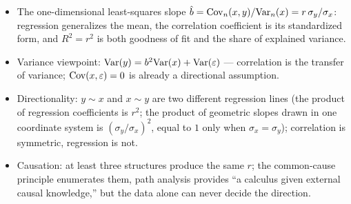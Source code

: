 \begin{keybox}
\begin{itemize}
  \item The one-dimensional least-squares slope $\hat{b} = \mathrm{Cov}_n(x,y)/\mathrm{Var}_n(x) = r\,\sigma_y/\sigma_x$: regression generalizes the mean, the correlation coefficient is its standardized form, and $R^2 = r^2$ is both goodness of fit and the share of explained variance.
  \item Variance viewpoint: $\mathrm{Var}(y) = b^2\mathrm{Var}(x) + \mathrm{Var}(\varepsilon)$ --- correlation is the transfer of variance; $\mathrm{Cov}(x,\varepsilon)=0$ is already a directional assumption.
  \item Directionality: $y \sim x$ and $x \sim y$ are two different regression lines (the product of regression coefficients is $r^2$; the product of geometric slopes drawn in one coordinate system is $(\sigma_y/\sigma_x)^2$, equal to $1$ only when $\sigma_x = \sigma_y$); correlation is symmetric, regression is not.
  \item Causation: at least three structures produce the same $r$; the common-cause principle enumerates them, path analysis provides ``a calculus given external causal knowledge,'' but the data alone can never decide the direction.
\end{itemize}
\end{keybox}
